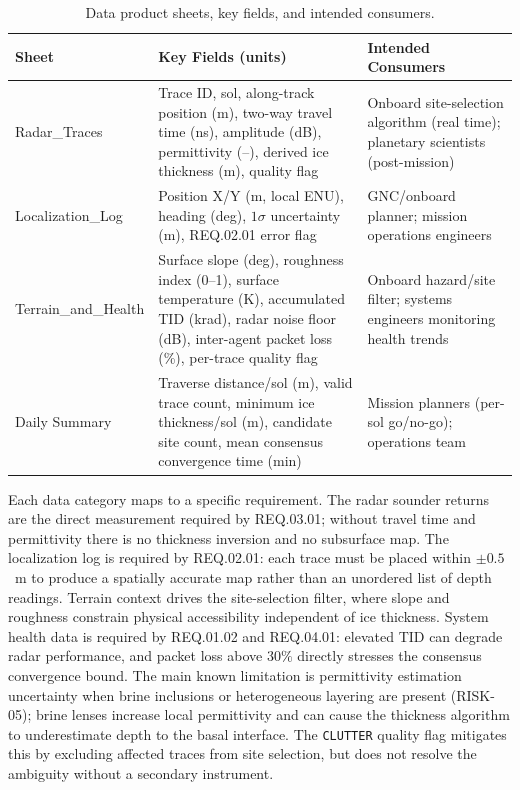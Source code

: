 \documentclass[11pt]{article}
\begin{document}
\begin{table}[H]
\centering
\small
\begin{tabular}{p{2.6cm}p{5.5cm}p{4.7cm}}
\toprule
\textbf{Sheet} & \textbf{Key Fields (units)} & \textbf{Intended Consumers} \\
\midrule
Radar\_Traces & Trace ID, sol, along-track position (m), two-way travel time (ns), amplitude
(dB), permittivity (--), derived ice thickness (m), quality flag & Onboard site-selection
algorithm (real time); planetary scientists (post-mission) \\
Localization\_Log & Position X/Y (m, local ENU), heading (deg), $1\sigma$ uncertainty (m),
REQ.02.01 error flag & GNC/onboard planner; mission operations engineers \\
Terrain\_and\_Health & Surface slope (deg), roughness index (0--1), surface temperature (K),
accumulated TID (krad), radar noise floor (dB), inter-agent packet loss (\%), per-trace quality
flag & Onboard hazard/site filter; systems engineers monitoring health trends \\
Daily Summary & Traverse distance/sol (m), valid trace count, minimum ice thickness/sol (m),
candidate site count, mean consensus convergence time (min) & Mission planners (per-sol
go/no-go); operations team \\
\bottomrule
\end{tabular}
\caption{Data product sheets, key fields, and intended consumers.}
\label{tab:data-sheets}
\end{table}

Each data category maps to a specific requirement. The radar sounder returns are the direct
measurement required by REQ.03.01; without travel time and permittivity there is no thickness
inversion and no subsurface map. The localization log is required by REQ.02.01: each trace must
be placed within $\pm 0.5$~m to produce a spatially accurate map rather than an unordered list of
depth readings. Terrain context drives the site-selection filter, where slope and roughness
constrain physical accessibility independent of ice thickness. System health data is required by
REQ.01.02 and REQ.04.01: elevated TID can degrade radar performance, and packet loss above
$30\%$ directly stresses the consensus convergence bound. The main known limitation is
permittivity estimation uncertainty when brine inclusions or heterogeneous layering are present
(RISK-05); brine lenses increase local permittivity and can cause the thickness algorithm to
underestimate depth to the basal interface. The \texttt{CLUTTER} quality flag mitigates this by
excluding affected traces from site selection, but does not resolve the ambiguity without a
secondary instrument.
\end{document}

